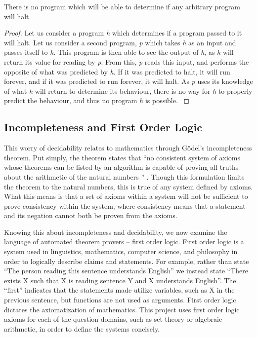 \begin{theorem}
There is no program which will be able to determine if any arbitrary program will halt.
\end{theorem}
\begin{proof}
Let us consider a program \textit{h} which determines if a program passed to it will halt. Let us consider a second program, \textit{p} which takes \textit{h} as an input and passes itself to \textit{h}. This program is then able to see the output of \textit{h}, as \textit{h} will return its value for reading by \textit{p}. From this, \textit{p} reads this input, and performs the opposite of what was predicted by \textit{h}. If it was predicted to halt, it will run forever, and if it was predicted to run forever, it will halt. As \textit{p} uses its knowledge of what \textit{h} will return to determine its behaviour, there is no way for \textit{h} to properly predict the behaviour, and thus no program \textit{h} is possible. \cite{haltProof}
\end{proof}

\subsection{Incompleteness and First Order Logic}
This worry of decidability relates to mathematics through G\"odel's incompleteness theorem. Put simply, the theorem states that ``no consistent system of axioms whose theorems can be listed by an algorithm is capable of proving all truths about the arithmetic of the natural numbers '' \cite{Godel}. Though this formulation limits the theorem to the natural numbers, this is true of any system defined by axioms. What this means is that a set of axioms within a system will not be sufficient to prove consistency within the system, where consistency means that a statement and its negation cannot both be proven from the axioms.

Knowing this about incompleteness and decidability, we now examine the language of automated theorem provers -- first order logic. First order logic is a system used in linguistics, mathematics, computer science, and philosophy in order to logically describe claims and statements. For example, rather than state ``The person reading this sentence understands English'' we instead state ``There exists X such that X is reading sentence Y and X understands English''. The ``first'' indicates that the statements made utilize variables, such as X in the previous sentence, but functions are not used as arguments. First order logic dictates the axiomatization of mathematics. This project uses first order logic axioms for each of the question domains, such as set theory or algebraic arithmetic, in order to define the systems concisely.

